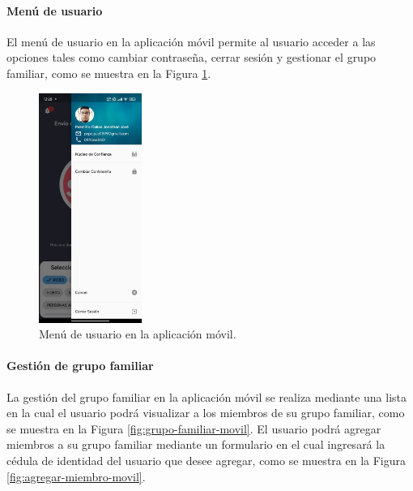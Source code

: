 \paragraph{Menú de usuario}
El menú de usuario en la aplicación móvil permite al usuario acceder a las opciones tales como cambiar contraseña, cerrar sesión y
gestionar el grupo familiar, como se muestra en la Figura \ref{fig:menu-usuario-movil}.

\begin{figure}[H]
    \centering
    \includegraphics[width=0.3\textwidth]{chapters/III-resultados-y-discusion/resources/images/menu-usuario-movil.png}
    \caption{Menú de usuario en la aplicación móvil.}
    \label{fig:menu-usuario-movil}
\end{figure}

\paragraph{Gestión de grupo familiar}
La gestión del grupo familiar en la aplicación móvil se realiza mediante una lista en la cual el usuario podrá visualizar a
los miembros de su grupo familiar, como se muestra en la Figura \ref{fig:grupo-familiar-movil}. El usuario podrá agregar
miembros a su grupo familiar mediante un formulario en el cual ingresará la cédula de identidad del usuario que desee
agregar, como se muestra en la Figura \ref{fig:agregar-miembro-movil}.

